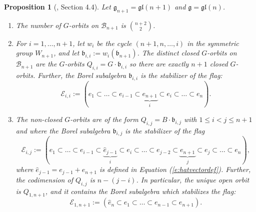 \documentclass[12pt]{amsart}
\numberwithin{equation}{section}
\newtheorem{prop}[thm]{Proposition}
\newcommand{\fg}{\mbox{${\mathfrak g}$}}
\newcommand{\fb}{\mbox{${\mathfrak b}$}}
\newcommand{\Ad}{{\rm Ad}}
\newcommand{\fgl}{\mathfrak{gl}}
\newcommand{\B}{\mathcal{B}}
\begin{document}

\begin{prop}[\cite{CEexp}, Section 4.4] \label{prop:typeAflag}
Let $\fg_{n+1}=\fgl(n+1)$ and $\fg=\fgl(n)$.  
\begin{enumerate}
\item The number of $G$-orbits on $\B_{n+1}$ is ${n+2\choose 2}$.  
\item For $i=1,\dots, n+1$, let $w_{i}$  be the cycle $(n+1, n, \dots, i)$ in the symmetric group $W_{n+1}$, 
and let $\fb_{i,i}:=w_{i}(\fb_{n+1})$.  The distinct closed $G$-orbits on $\B_{n+1}$ are the $G$-orbits $Q_{i,i}=G\cdot \fb_{i,i}$ so there are exactly $n+1$ closed $G$-orbits.  Further, the Borel subalgebra $\fb_{i,i}$ is 
the stabilizer of the flag:
\begin{equation}\label{eq:flagi}
\mathcal{E}_{i,i}:=(e_{1}\subset\dots \subset e_{i-1}\subset\underbrace{e_{n+1}}_{i}\subset e_{i}\subset \dots \subset e_{n}). 
\end{equation}
\item The non-closed $G$-orbits are of the form $Q_{i,j}=B\cdot \fb_{i,j}$ 
with $1\leq i< j\leq n+1$ and where the Borel subalgebra $\fb_{i,j}$ is the stabilizer of the flag 
\begin{equation}\label{eq:flagij}
\mathcal{E}_{i,j}:=(e_{1}\subset\dots\subset e_{i-1} \subset \underbrace{\hat{e}_{j-1}}_{i}\subset e_{i}\subset\dots\subset e_{j-2}\subset\underbrace{e_{n+1}}_{j}\subset e_{j}\subset\dots\subset e_{n}),
\end{equation}
where $\hat{e}_{j-1}=e_{j-1}+e_{n+1}$ is defined in Equation (\ref{e:hatvectordef}).
Further, the codimension of $Q_{i,j}$ is $n-(j-i)$.
In particular, the unique open orbit is $Q_{1,n+1}$, and it contains the Borel subalgebra 
which stabilizes the flag:
\begin{equation}\label{eq:openflag}
\mathcal{E}_{1,n+1}:=(\hat{e}_{n}\subset e_{1}\subset\dots\subset e_{n-1}\subset e_{n+1}). 
\end{equation}
\end{enumerate}
\end{prop}
\end{document}
